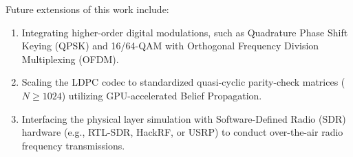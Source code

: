 \documentclass[conference]{IEEEtran}
\begin{document}
Future extensions of this work include:
\begin{enumerate}
    \item Integrating higher-order digital modulations, such as Quadrature Phase Shift Keying (QPSK) and 16/64-QAM with Orthogonal Frequency Division Multiplexing (OFDM).
    \item Scaling the LDPC codec to standardized quasi-cyclic parity-check matrices ($N \ge 1024$) utilizing GPU-accelerated Belief Propagation.
    \item Interfacing the physical layer simulation with Software-Defined Radio (SDR) hardware (e.g., RTL-SDR, HackRF, or USRP) to conduct over-the-air radio frequency transmissions.
\end{enumerate}



\end{document}
